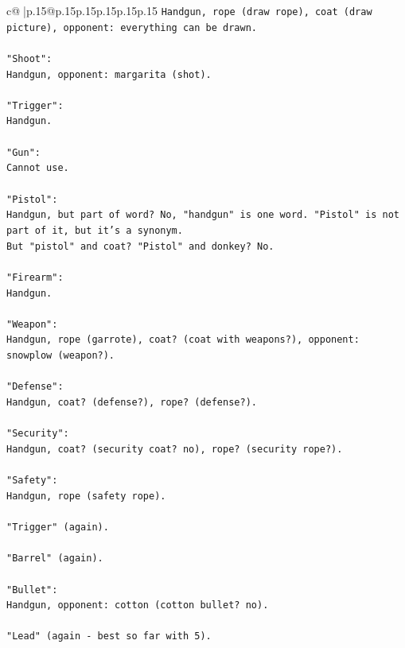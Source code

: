 \documentclass{article}
\begin{document}
{\begin{supertabular}{c@{$\;$}|p{.15\linewidth}@{}p{.15\linewidth}p{.15\linewidth}p{.15\linewidth}p{.15\linewidth}p{.15\linewidth}}
{{{\texttt{Handgun, rope (draw rope), coat (draw picture), opponent: everything can be drawn.} \\
\\ 
\texttt{"Shoot":} \\
\texttt{Handgun, opponent: margarita (shot).} \\
\\ 
\texttt{"Trigger":} \\
\texttt{Handgun.} \\
\\ 
\texttt{"Gun":} \\
\texttt{Cannot use.} \\
\\ 
\texttt{"Pistol":} \\
\texttt{Handgun, but part of word? No, "handgun" is one word. "Pistol" is not part of it, but it's a synonym.} \\
\texttt{But "pistol" and coat? "Pistol" and donkey? No.} \\
\\ 
\texttt{"Firearm":} \\
\texttt{Handgun.} \\
\\ 
\texttt{"Weapon":} \\
\texttt{Handgun, rope (garrote), coat? (coat with weapons?), opponent: snowplow (weapon?).} \\
\\ 
\texttt{"Defense":} \\
\texttt{Handgun, coat? (defense?), rope? (defense?).} \\
\\ 
\texttt{"Security":} \\
\texttt{Handgun, coat? (security coat? no), rope? (security rope?).} \\
\\ 
\texttt{"Safety":} \\
\texttt{Handgun, rope (safety rope).} \\
\\ 
\texttt{"Trigger" (again).} \\
\\ 
\texttt{"Barrel" (again).} \\
\\ 
\texttt{"Bullet":} \\
\texttt{Handgun, opponent: cotton (cotton bullet? no).} \\
\\ 
\texttt{"Lead" (again {-} best so far with 5).} \\
}}}
\end{supertabular}}
\end{document}
